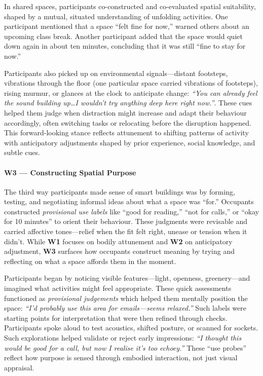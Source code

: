 In shared spaces, participants co-constructed and co-evaluated spatial suitability, shaped by a mutual, situated understanding of unfolding activities. One participant mentioned that a space ``felt fine for now,'' warned others about an upcoming class break. Another participant added that the space would quiet down again in about ten minutes, concluding that it was still ``fine to stay for now.'' 

Participants also picked up on environmental signals---distant footsteps, vibrations through the floor (one particular space carried vibrations of footsteps), rising murmur, or glances at the clock to anticipate change: \textit{``You can already feel the sound building up\ldots I wouldn’t try anything deep here right now.''}. These cues helped them judge when distraction might increase and adapt their behaviour accordingly, often switching tasks or relocating before the disruption happened. This forward-looking stance reflects attunement to shifting patterns of activity with anticipatory adjustments shaped by prior experience, social knowledge, and subtle cues.


\paragraph{W3 --- Constructing Spatial Purpose}
\label{theme:w3}
The third way participants made sense of smart buildings was by forming, testing, and negotiating informal ideas about what a space was ``for.'' Occupants constructed \textit{provisional use labels} like ``good for reading,'' ``not for calls,'' or ``okay for 10 minutes'' to orient their behaviour. These judgments were revisable and carried affective tones---relief when the fit felt right, unease or tension when it didn’t. While \textbf{W1} focuses on bodily attunement and \textbf{W2} on anticipatory adjustment, \textbf{W3} surfaces how occupants construct meaning by trying and reflecting on what a space affords them in the moment. 

Participants began by noticing visible features---light, openness, greenery---and imagined what activities might feel appropriate. These quick assessments functioned as \textit{provisional judgements} which helped them mentally position the space: \textit{“I’d probably use this area for emails—seems relaxed.”} Such labels were starting points for interpretation that were then refined through checks.  Participants spoke aloud to test acoustics, shifted posture, or scanned for sockets. Such explorations helped validate or reject early impressions: \textit{``I thought this would be good for a call, but now I realise it’s too echoey.''} These ``use probes'' reflect how purpose is sensed through embodied interaction, not just visual appraisal.

